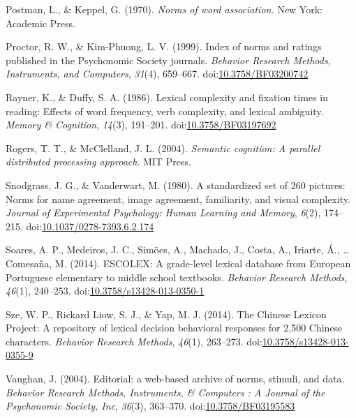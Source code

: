 \documentclass[english,man]{apa6}
\theoremstyle{definition}
\theoremstyle{definition}
\theoremstyle{definition}
\theoremstyle{remark}
\begin{document}
\hypertarget{ref-Postman1970}{}
Postman, L., \& Keppel, G. (1970). \emph{Norms of word association.} New
York: Academic Press.

\hypertarget{ref-Proctor1999}{}
Proctor, R. W., \& Kim-Phuong, L. V. (1999). Index of norms and ratings
published in the Psychonomic Society journals. \emph{Behavior Research
Methods, Instruments, and Computers}, \emph{31}(4), 659--667.
doi:\href{https://doi.org/10.3758/BF03200742}{10.3758/BF03200742}

\hypertarget{ref-Rayner1986}{}
Rayner, K., \& Duffy, S. A. (1986). Lexical complexity and fixation
times in reading: Effects of word frequency, verb complexity, and
lexical ambiguity. \emph{Memory \& Cognition}, \emph{14}(3), 191--201.
doi:\href{https://doi.org/10.3758/BF03197692}{10.3758/BF03197692}

\hypertarget{ref-Rogers2004}{}
Rogers, T. T., \& McClelland, J. L. (2004). \emph{Semantic cognition: A
parallel distributed processing approach}. MIT Press.

\hypertarget{ref-Snodgrass1980}{}
Snodgrass, J. G., \& Vanderwart, M. (1980). A standardized set of 260
pictures: Norms for name agreement, image agreement, familiarity, and
visual complexity. \emph{Journal of Experimental Psychology: Human
Learning and Memory}, \emph{6}(2), 174--215.
doi:\href{https://doi.org/10.1037/0278-7393.6.2.174}{10.1037/0278-7393.6.2.174}

\hypertarget{ref-Soares2014}{}
Soares, A. P., Medeiros, J. C., Simões, A., Machado, J., Costa, A.,
Iriarte, Á., \ldots{} Comesaña, M. (2014). ESCOLEX: A grade-level
lexical database from European Portuguese elementary to middle school
textbooks. \emph{Behavior Research Methods}, \emph{46}(1), 240--253.
doi:\href{https://doi.org/10.3758/s13428-013-0350-1}{10.3758/s13428-013-0350-1}

\hypertarget{ref-Sze2014}{}
Sze, W. P., Rickard Liow, S. J., \& Yap, M. J. (2014). The Chinese
Lexicon Project: A repository of lexical decision behavioral responses
for 2,500 Chinese characters. \emph{Behavior Research Methods},
\emph{46}(1), 263--273.
doi:\href{https://doi.org/10.3758/s13428-013-0355-9}{10.3758/s13428-013-0355-9}

\hypertarget{ref-Vaughan2004}{}
Vaughan, J. (2004). Editorial: a web-based archive of norms, stimuli,
and data. \emph{Behavior Research Methods, Instruments, \& Computers : A
Journal of the Psychonomic Society, Inc}, \emph{36}(3), 363--370.
doi:\href{https://doi.org/10.3758/BF03195583}{10.3758/BF03195583}
\end{document}
